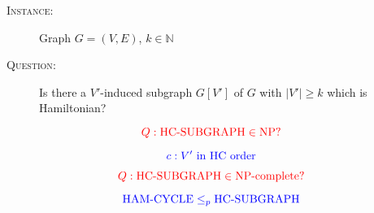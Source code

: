 \begin{frame}
  \begin{definition}[HC-SUBGRAPH]
	\begin{description}
	  \item[\textsc{Instance}:] Graph $G = (V, E)$, $k \in \mathbb{N}$
	  \item[\textsc{Question}:] Is there a $V'$-induced subgraph $G[V']$ of $G$ with $|V'| \ge k$ which is Hamiltonian?
	\end{description}
  \end{definition}

  \pause
  \[
	\textcolor{red}{Q: \text{HC-SUBGRAPH} \in \text{NP}?}
  \]

  \pause
  \[
	\textcolor{blue}{c: V' \text{ in HC order}}
  \]

  \pause
  \[
	\textcolor{red}{Q: \text{HC-SUBGRAPH} \in \text{NP-complete}?}
  \]

  \pause
  \[
	\textcolor{blue}{\text{HAM-CYCLE}{} \le_{p}{} \text{HC-SUBGRAPH}}
  \]
\end{frame}
